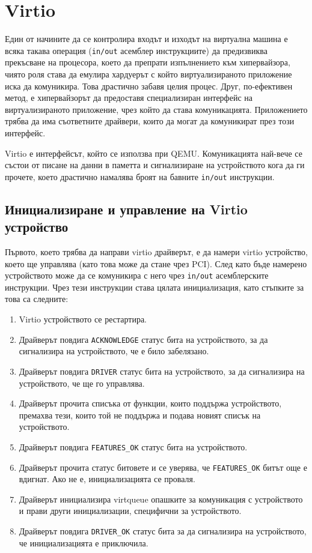 \section{Virtio}

Един от начините да се контролира входът и изходът на виртуална машина е всяка такава операция ({\tt in/out} асемблер инструкциите) да предизвиква прекъсване на процесора, което да препрати изпълнението към хипервайзора, чиято роля става да емулира хардуерът с който виртуализираното приложение иска да комуникира. Това драстично забавя целия процес. Друг, по-ефективен метод, е хипервайзорът да предоставя специализиран интерфейс на виртуализираното приложение, чрез който да става комуникацията. Приложението трябва да има съответните драйвери, които да могат да комуникират през този интерфейс.

Virtio е интерфейсът, който се използва при QEMU. Комуникацията най-вече се състои от писане на данни в паметта и сигнализиране на устройството кога да ги прочете, което драстично намалява броят на бавните {\tt in/out} инструкции.

  \subsection{Инициализиране и управление на Virtio устройство}
  Първото, което трябва да направи virtio драйверът, е да намери virtio устройство, което ще управлява (като това може да стане чрез PCI). След като бъде намерено устройството може да се комуникира с него чрез {\tt in/out} асемблерските инструкции. Чрез тези инструкции става цялата инициализация, като стъпките за това са следните:
  \begin{enumerate}
    \item Virtio устройството се рестартира.
    \item Драйверът повдига {\tt ACKNOWLEDGE} статус бита на устройството, за да сигнализира на устройството, че е било забелязано.
    \item Драйверът повдига {\tt DRIVER} статус бита на устройството, за да сигнализира на устройството, че ще го управлява.
    \item Драйверът прочита списъка от функции, които поддържа устройството, премахва тези, които той не поддържа и подава новият списък на устройството.
    \item Драйверът повдига {\tt FEATURES\_OK} статус бита на устройството.
    \item Драйверът прочита статус битовете и се уверява, че {\tt FEATURES\_OK} битът още е вдигнат. Ако не е, инициализацията се проваля.
    \item Драйверът инициализира virtqueue опашките за комуникация с устройството и прави други инициализации, специфични за устройството.
    \item Драйверът повдига {\tt DRIVER\_OK} статус бита за да сигнализира на устройството, че инициализацията е приключила.
  \end{enumerate}

